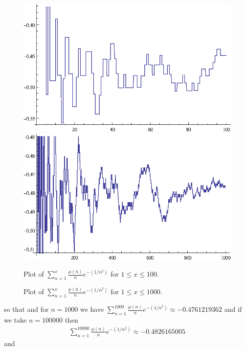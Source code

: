 \documentclass[11pt]{article}
\numberwithin{equation}{section}		 			%
\numberwithin{figure}{section}			 			%
\begin{document}
\begin{figure}[H]
		\includegraphics[scale=0.96]{MoebiusNov100and1000and10000_gr1.eps}
		\includegraphics[scale=0.96]{MoebiusNov100and1000and10000_gr2.eps}
	\caption{Plot of $\sum\nolimits_{n = 1}^{x} {\tfrac{{\mu (n)}}{n}e^{ - (1/n^2 )} }$ for $1 \le x \le 100$.}
	\caption{Plot of $\sum\nolimits_{n = 1}^{x} {\tfrac{{\mu (n)}}{n}e^{ - (1/n^2 )} }$ for $1 \le x \le 1000$.}
\end{figure}
\noindent so that and for $n=1000$ we have $\sum\nolimits_{n = 1}^{1000} {\tfrac{{\mu (n)}}{n}e^{ - (1/n^2 )} }  \approx  - 0.4761219362$ and if we take $n=100000$ then 
\begin{align} \label{numerical_sum_100000_moebius}
\sum\nolimits_{n = 1}^{10000} {\tfrac{{\mu (n)}}{n}e^{ - (1/n^2 )} }  \approx  - 0.4826165005
\end{align}
\noindent and
\end{document}
